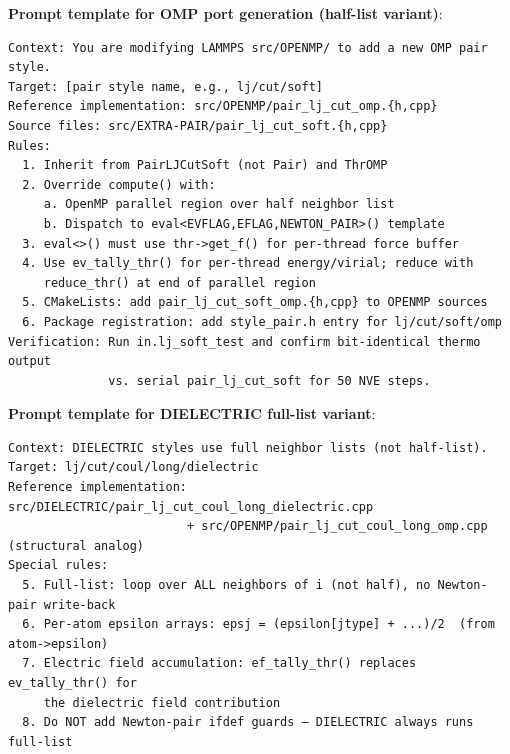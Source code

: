 \documentclass[
  11pt,
]{article}
\begin{document}
\textbf{Prompt template for OMP port generation (half-list variant)}:

\begin{verbatim}
Context: You are modifying LAMMPS src/OPENMP/ to add a new OMP pair style.
Target: [pair style name, e.g., lj/cut/soft]
Reference implementation: src/OPENMP/pair_lj_cut_omp.{h,cpp}
Source files: src/EXTRA-PAIR/pair_lj_cut_soft.{h,cpp}
Rules:
  1. Inherit from PairLJCutSoft (not Pair) and ThrOMP
  2. Override compute() with:
     a. OpenMP parallel region over half neighbor list
     b. Dispatch to eval<EVFLAG,EFLAG,NEWTON_PAIR>() template
  3. eval<>() must use thr->get_f() for per-thread force buffer
  4. Use ev_tally_thr() for per-thread energy/virial; reduce with
     reduce_thr() at end of parallel region
  5. CMakeLists: add pair_lj_cut_soft_omp.{h,cpp} to OPENMP sources
  6. Package registration: add style_pair.h entry for lj/cut/soft/omp
Verification: Run in.lj_soft_test and confirm bit-identical thermo output
              vs. serial pair_lj_cut_soft for 50 NVE steps.
\end{verbatim}

\textbf{Prompt template for DIELECTRIC full-list variant}:

\begin{verbatim}
Context: DIELECTRIC styles use full neighbor lists (not half-list).
Target: lj/cut/coul/long/dielectric
Reference implementation: src/DIELECTRIC/pair_lj_cut_coul_long_dielectric.cpp
                         + src/OPENMP/pair_lj_cut_coul_long_omp.cpp (structural analog)
Special rules:
  5. Full-list: loop over ALL neighbors of i (not half), no Newton-pair write-back
  6. Per-atom epsilon arrays: epsj = (epsilon[jtype] + ...)/2  (from atom->epsilon)
  7. Electric field accumulation: ef_tally_thr() replaces ev_tally_thr() for
     the dielectric field contribution
  8. Do NOT add Newton-pair ifdef guards — DIELECTRIC always runs full-list
\end{verbatim}
\end{document}
